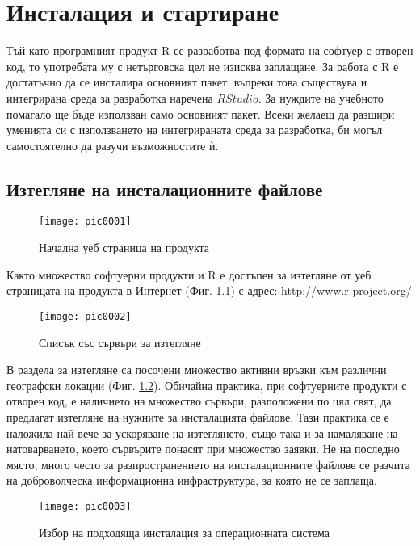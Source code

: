 \newpage
\chapter{Инсталация и стартиране}
\label{chapter01}
\thispagestyle{empty}

Тъй като програмният продукт R се разработва под формата на софтуер с отворен код, то употребата му с нетърговска цел не изисква заплащане. За работа с R е достатъчно да се инсталира основният пакет, въпреки това съществува и интегрирана среда за разработка наречена $R Studio$\cite{rstudio}. За нуждите на учебното помагало ще бъде използван само основният пакет. Всеки желаещ да разшири уменията си с използването на интегрираната среда за разработка, би могъл самостоятелно да разучи възможностите ѝ.

\section{Изтегляне на инсталационните файлове}

\begin{figure}[h!]
  \centering
  \texttt{[image: pic0001]}
  \caption{Начална уеб страница на продукта}
\label{figure0001}
\end{figure}
\FloatBarrier

Както множество софтуерни продукти и R е достъпен за изтегляне от уеб страницата на продукта в Интернет (Фиг. \ref{figure0001}) с адрес: http://www.r-project.org/

\begin{figure}[h]
  \centering
  \texttt{[image: pic0002]}
  \caption{Списък със сървъри за изтегляне}
\label{figure0002}
\end{figure}
\FloatBarrier

В раздела за изтегляне са посочени множество активни връзки към различни географски локации (Фиг. \ref{figure0002}). Обичайна практика, при софтуерните продукти с отворен код, е наличието на множество сървъри, разположени по цял свят, да предлагат изтегляне на нужните за инсталацията файлове. Тази практика се е наложила най-вече за ускоряване на изтеглянето, също така и за намаляване на натоварването, което сървърите понасят при множество заявки. Не на последно място, много често за разпространението на инсталационните файлове се разчита на доброволческа информационна инфраструктура, за която не се заплаща.

\begin{figure}[h]
  \centering
  \texttt{[image: pic0003]}
  \caption{Избор на подходяща инсталация за операционната система }
\label{figure0003}
\end{figure}
\FloatBarrier

